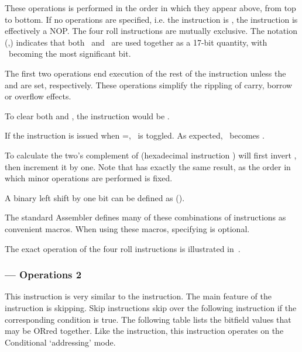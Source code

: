 These operations is performed in the order in which they appear above,
from top to bottom. If no operations are specified, i.e. the
instruction is , the instruction is effectively a NOP. The
four roll instructions are mutually exclusive. The notation (\Lreg,\A)
indicates that both \Lreg\ and \A\ are used together as a 17-bit
quantity, with \Lreg\ becoming the most significant bit.

The first two operations end execution of the rest of the instruction
unless the \Lreg{} and \Vreg{} are set, respectively. These operations
simplify the rippling of carry, borrow or overflow effects.

To clear both \A{} and \Lreg, the instruction would be .

If the  instruction is issued when \A=, \Lreg\ is
toggled. As expected, \A\ becomes .

To calculate the two's complement of \A{}  (hexadecimal
instruction ) will first invert \A{}, then increment it by
one. Note that  has exactly the same result, as the
order in which minor operations are performed is fixed.

A binary left shift by one bit can be defined as 
().

The standard Assembler defines many of these combinations of instructions as
convenient macros. When using these macros, specifying  is optional.

The exact operation of the four roll instructions is illustrated
in~.

\subsubsection{ — Operations 2}
\label{sec:instruction-OP2}

This instruction is very similar to the  instruction. The main
feature of the  instruction is skipping. Skip instructions skip over
the following instruction if the corresponding condition is true. The following
table lists the  bitfield values that may be ORred together. Like
the  instruction, this instruction operates on the Conditional
‘addressing’ mode.

